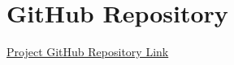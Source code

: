 \appendix
	\label{app:Appendix}
	\section{GitHub Repository}
		\href{https://github.com/paymog/4420-Research-Paper}{Project GitHub Repository Link}


%
%
%
%
%
%
